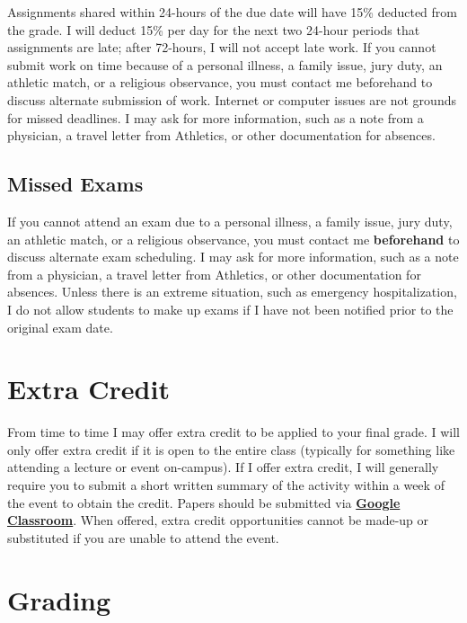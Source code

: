 \documentclass[]{book}
\theoremstyle{definition}
\theoremstyle{definition}
\theoremstyle{definition}
\theoremstyle{remark}
\begin{document}
Assignments shared within 24-hours of the due date will have 15\%
deducted from the grade. I will deduct 15\% per day for the next two
24-hour periods that assignments are late; after 72-hours, I will not
accept late work. If you cannot submit work on time because of a
personal illness, a family issue, jury duty, an athletic match, or a
religious observance, you must contact me beforehand to discuss
alternate submission of work. Internet or computer issues are not
grounds for missed deadlines. I may ask for more information, such as a
note from a physician, a travel letter from Athletics, or other
documentation for absences.

\hypertarget{missed-exams}{%
\subsection{Missed Exams}\label{missed-exams}}

If you cannot attend an exam due to a personal illness, a family issue,
jury duty, an athletic match, or a religious observance, you must
contact me \textbf{beforehand} to discuss alternate exam scheduling. I
may ask for more information, such as a note from a physician, a travel
letter from Athletics, or other documentation for absences. Unless there
is an extreme situation, such as emergency hospitalization, I do not
allow students to make up exams if I have not been notified prior to the
original exam date.

\hypertarget{extra-credit}{%
\section{Extra Credit}\label{extra-credit}}

From time to time I may offer extra credit to be applied to your final
grade. I will only offer extra credit if it is open to the entire class
(typically for something like attending a lecture or event on-campus).
If I offer extra credit, I will generally require you to submit a short
written summary of the activity within a week of the event to obtain the
credit. Papers should be submitted via
\textbf{\href{https://classroom.google.com}{Google Classroom}}. When
offered, extra credit opportunities cannot be made-up or substituted if
you are unable to attend the event.

\hypertarget{grading}{%
\section{Grading}\label{grading}}
\end{document}
